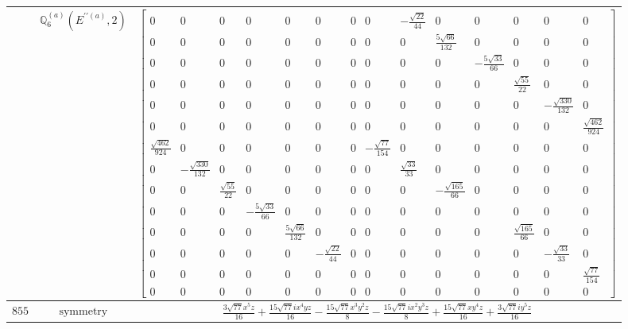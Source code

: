 \documentclass[fleqn,8pt,landscape]{jsarticle}
\begin{document}
\begin{longtable}{ccc}
$  $ & $ \mathbb{Q}_{6}^{(a)}(E^{\prime\prime(a)},2) $ & $ \begin{bmatrix} 0 & 0 & 0 & 0 & 0 & 0 & 0 & 0 & - \frac{\sqrt{22}}{44} & 0 & 0 & 0 & 0 & 0 \\ 0 & 0 & 0 & 0 & 0 & 0 & 0 & 0 & 0 & \frac{5 \sqrt{66}}{132} & 0 & 0 & 0 & 0 \\ 0 & 0 & 0 & 0 & 0 & 0 & 0 & 0 & 0 & 0 & - \frac{5 \sqrt{33}}{66} & 0 & 0 & 0 \\ 0 & 0 & 0 & 0 & 0 & 0 & 0 & 0 & 0 & 0 & 0 & \frac{\sqrt{55}}{22} & 0 & 0 \\ 0 & 0 & 0 & 0 & 0 & 0 & 0 & 0 & 0 & 0 & 0 & 0 & - \frac{\sqrt{330}}{132} & 0 \\ 0 & 0 & 0 & 0 & 0 & 0 & 0 & 0 & 0 & 0 & 0 & 0 & 0 & \frac{\sqrt{462}}{924} \\ \frac{\sqrt{462}}{924} & 0 & 0 & 0 & 0 & 0 & 0 & - \frac{\sqrt{77}}{154} & 0 & 0 & 0 & 0 & 0 & 0 \\ 0 & - \frac{\sqrt{330}}{132} & 0 & 0 & 0 & 0 & 0 & 0 & \frac{\sqrt{33}}{33} & 0 & 0 & 0 & 0 & 0 \\ 0 & 0 & \frac{\sqrt{55}}{22} & 0 & 0 & 0 & 0 & 0 & 0 & - \frac{\sqrt{165}}{66} & 0 & 0 & 0 & 0 \\ 0 & 0 & 0 & - \frac{5 \sqrt{33}}{66} & 0 & 0 & 0 & 0 & 0 & 0 & 0 & 0 & 0 & 0 \\ 0 & 0 & 0 & 0 & \frac{5 \sqrt{66}}{132} & 0 & 0 & 0 & 0 & 0 & 0 & \frac{\sqrt{165}}{66} & 0 & 0 \\ 0 & 0 & 0 & 0 & 0 & - \frac{\sqrt{22}}{44} & 0 & 0 & 0 & 0 & 0 & 0 & - \frac{\sqrt{33}}{33} & 0 \\ 0 & 0 & 0 & 0 & 0 & 0 & 0 & 0 & 0 & 0 & 0 & 0 & 0 & \frac{\sqrt{77}}{154} \\ 0 & 0 & 0 & 0 & 0 & 0 & 0 & 0 & 0 & 0 & 0 & 0 & 0 & 0 \end{bmatrix} $ \\ \hline
$ 855 $ & $ \text{symmetry} $ & $ \frac{3 \sqrt{77} x^{5} z}{16} + \frac{15 \sqrt{77} i x^{4} y z}{16} - \frac{15 \sqrt{77} x^{3} y^{2} z}{8} - \frac{15 \sqrt{77} i x^{2} y^{3} z}{8} + \frac{15 \sqrt{77} x y^{4} z}{16} + \frac{3 \sqrt{77} i y^{5} z}{16} $ \\

\end{longtable}
\end{document}
